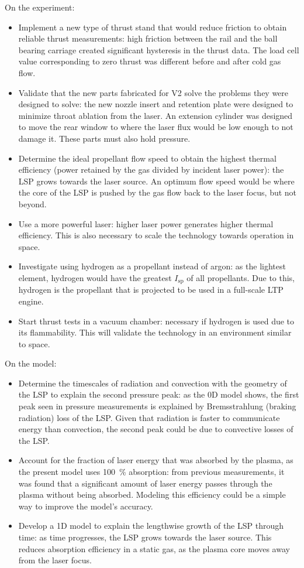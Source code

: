         On the experiment:
        \begin{itemize}
            \item Implement a new type of thrust stand that would reduce friction to obtain reliable thrust measurements: high friction between the rail and the ball bearing carriage created significant hysteresis in the thrust data. The load cell value corresponding to zero thrust was different before and after cold gas flow.
            \item Validate that the new parts fabricated for V2 solve the problems they were designed to solve: the new nozzle insert and retention plate were designed to minimize throat ablation from the laser. An extension cylinder was designed to move the rear window to where the laser flux would be low enough to not damage it. These parts must also hold pressure.
            \item Determine the ideal propellant flow speed to obtain the highest thermal efficiency (power retained by the gas divided by incident laser power): the LSP grows towards the laser source. An optimum flow speed would be where the core of the LSP is pushed by the gas flow back to the laser focus, but not beyond. 
            \item Use a more powerful laser: higher laser power generates higher thermal efficiency. This is also necessary to scale the technology towards operation in space.
            \item Investigate using hydrogen as a propellant instead of argon: as the lightest element, hydrogen would have the greatest $I_\mathrm{sp}$ of all propellants. Due to this, hydrogen is the propellant that is projected to be used in a full-scale LTP engine.
            \item Start thrust tests in a vacuum chamber: necessary if hydrogen is used due to its flammability. This will validate the technology in an environment similar to space.
        \end{itemize}

        On the model:
        \begin{itemize}
            \item Determine the timescales of radiation and convection with the geometry of the LSP to explain the second pressure peak: as the 0D model shows, the first peak seen in pressure measurements is explained by Bremsstrahlung (braking radiation) loss of the LSP. Given that radiation is faster to communicate energy than convection, the second peak could be due to convective losses of the LSP.
            \item Account for the fraction of laser energy that was absorbed by the plasma, as the present model uses \qty{100}{\%} absorption: from previous measurements, it was found that a significant amount of laser energy passes through the plasma without being absorbed. Modeling this efficiency could be a simple way to improve the model's accuracy.
            \item Develop a 1D model to explain the lengthwise growth of the LSP through time: as time progresses, the LSP grows towards the laser source. This reduces absorption efficiency in a static gas, as the plasma core moves away from the laser focus.
        \end{itemize}
        
